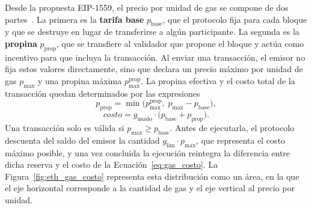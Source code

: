 Desde la propuesta EIP-1559, el precio por unidad de gas se compone de dos partes~\cite{eip1559}.
La primera es la \textbf{tarifa base} $p_{\mathrm{base}}$, que el protocolo fija para cada
bloque y que se destruye en lugar de transferirse a algún participante. La segunda es la
\textbf{propina} $p_{\mathrm{prop}}$, que se transfiere al validador que propone el bloque y
actúa como incentivo para que incluya la transacción. Al enviar una transacción, el emisor no
fija estos valores directamente, sino que declara un precio máximo por unidad de gas
$p_{\max}$ y una propina máxima $p^{\mathrm{prop}}_{\max}$. La propina efectiva y el costo
total de la transacción quedan determinados por las expresiones
\begin{equation}
	\label{eq:gas_propina}
	p_{\mathrm{prop}} = \min\bigl(p^{\mathrm{prop}}_{\max},\; p_{\max} - p_{\mathrm{base}}\bigr),
\end{equation}
\begin{equation}
	\label{eq:gas_costo}
	\mathit{costo} = g_{\mathrm{usado}} \cdot \bigl(p_{\mathrm{base}} + p_{\mathrm{prop}}\bigr).
\end{equation}
Una transacción solo es válida si $p_{\max} \geq p_{\mathrm{base}}$. Antes de ejecutarla, el
protocolo descuenta del saldo del emisor la cantidad $g_{\mathrm{lim}} \cdot p_{\max}$, que
representa el costo máximo posible, y una vez concluida la ejecución reintegra la diferencia
entre dicha reserva y el costo de la Ecuación~\eqref{eq:gas_costo}. La
Figura~\ref{fig:eth_gas_costo} representa esta distribución como un área, en la que el eje
horizontal corresponde a la cantidad de gas y el eje vertical al precio por unidad.

